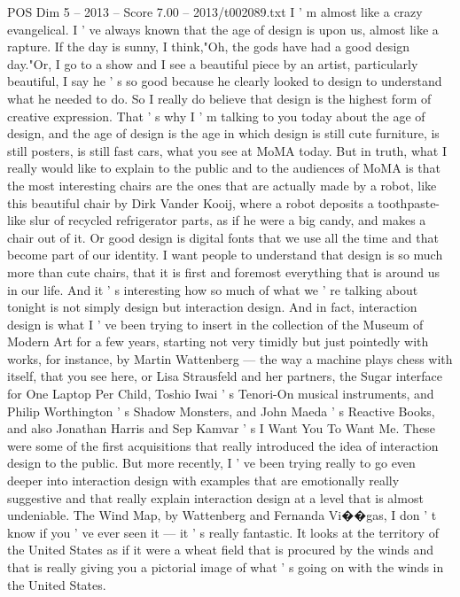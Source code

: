 \begin{textsample}{POS Dim 5 – 2013 – Score 7.00 – 2013/t002089.txt}  \label{ex:f5_pos_040}
I ' m almost like a crazy evangelical.
I ' ve always known that the age of design is upon us, almost like a rapture.
If the day is sunny, I think,"Oh, the gods have had a good design day."Or, I go to a show and I see a beautiful piece by an artist, particularly beautiful, I say he ' s so good because he clearly looked to design to understand what he needed to do.
So I really do believe that design is the highest form of creative expression.
That ' s why I ' m talking to you today about the age of design, and the age of design is the age in which design is still cute furniture, is still posters, is still fast cars, what you see at MoMA today.
But in truth, what I really would like to explain to the public and to the audiences of MoMA is that the most interesting chairs are the ones that are actually made by a robot, like this beautiful chair by Dirk Vander Kooij, where a robot deposits a toothpaste-like slur of recycled refrigerator parts, as if he were a big candy, and makes a chair out of it.
Or good design is digital fonts that we use all the time and that become part of our identity.
I want people to understand that design is so much more than cute chairs, that it is first and foremost everything that is around us in our life.
And it ' s interesting how so much of what we ' re talking about tonight is not simply design but interaction design.
And in fact, interaction design is what I ' ve been trying to insert in the collection of the Museum of Modern Art for a few years, starting not very timidly but just pointedly with works, for instance, by Martin Wattenberg — the way a machine plays chess with itself, that you see here, or Lisa Strausfeld and her partners, the Sugar interface for One Laptop Per Child, Toshio Iwai ' s Tenori-On musical instruments, and Philip Worthington ' s Shadow Monsters, and John Maeda ' s Reactive Books, and also Jonathan Harris and Sep Kamvar ' s I Want You To Want Me.
These were some of the first acquisitions that really introduced the idea of interaction design to the public.
But more recently, I ' ve been trying really to go even deeper into interaction design with examples that are emotionally really suggestive and that really explain interaction design at a level that is almost undeniable.
The Wind Map, by Wattenberg and Fernanda Vi{\EmojiFont �}{\EmojiFont �}gas, I don ' t know if you ' ve ever seen it — it ' s really fantastic.
It looks at the territory of the United States as if it were a wheat field that is procured by the winds and that is really giving you a pictorial image of what ' s going on with the winds in the United States.

\end{textsample}
